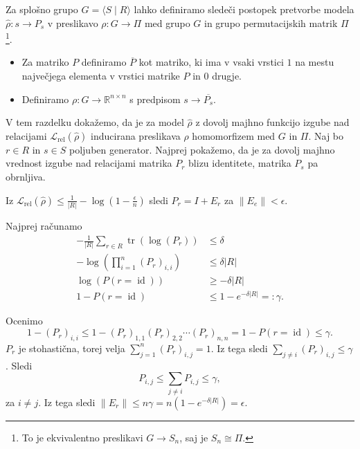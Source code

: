 \documentclass[mat2, tisk]{fmfdelo}
\newcommand{\R}{\mathbb R}
\newcommand{\Loss}[1]{\mathcal L _\text{#1}}
\begin{document}
Za splošno grupo $G=\langle S \mid R \rangle$ lahko definiramo sledeči
postopek pretvorbe modela
$\hat \rho \colon s \to P_s$ v preslikavo $\rho \colon G
\to  \Pi$ med grupo $G$ in grupo permutacijskih matrik
$\Pi$\footnote{To je ekvivalentno preslikavi $G \to
S_n$, saj je $S_n\cong \Pi$.}.
\begin{itemize}
  \item Za matriko $P$ definiramo $\overline{P}$ kot
    matriko, ki ima v vsaki vrstici $1$ na mestu
    največjega elementa v vrstici matrike $P$ in $0$ drugje.
  \item Definiramo $\rho \colon G \to \R^{n \times n}$
    s predpisom $s \to \overline{P_s}$.
\end{itemize}
V tem razdelku dokažemo, da je za model $\hat \rho$ z
dovolj majhno funkcijo izgube nad relacijami
$\Loss{rel}(\hat \rho)$ inducirana preslikava $\rho$
homomorfizem med $G$ in $\Pi$.
%
Naj bo $r\in R$ in $s \in S$ poljuben generator.
Najprej pokažemo, da je za dovolj majhno
vrednost izgube nad relacijami matrika $P_r$ blizu
identitete, matrika $P_s$ pa obrnljiva.
\begin{lema}
  \label{lema:Pr blizu I}
  Iz $\Loss{rel}(\hat\rho) \leq
  \frac{1}{|R|}-\log(1-\frac{\epsilon}{n}) $
  sledi $P_r = I +
  E_r$ za $\|E_e\| < \epsilon$.
\end{lema}
\begin{dokaz}
  Najprej računamo
  \begin{align*}
    - \frac{1}{|R|} \sum_{r \in
    R} \operatorname{tr}(\log(P_r)) &\leq \delta \\
    -\log(\prod_{i=1}^n(P_r)_{i,i}) &\leq \delta |R| \\
    \log(P(r = \operatorname{id})) &\geq -\delta |R| \\
    1 - P(r = \operatorname{id}) &\leq 1 - e^{-\delta
    |R|} =: \gamma.
  \end{align*}

  Ocenimo
  $$ 1 - (P_r)_{i,i} \leq  1 - (P_r)_{1,1}
  (P_r)_{2,2} \dotsm (P_r)_{n,n}
  = 1 - P(r=\operatorname{id})\leq \gamma.$$
  $P_r$ je stohastična, torej velja
  $\sum_{j=1}^n (P_r)_{i,j} = 1$. Iz tega sledi
  $\sum_{j \neq i}
  (P_r)_{i,j} \leq \gamma$. Sledi
  $$
  P_{i, j} \leq \sum_{j \neq i} P_{i,j} \leq \gamma,
  $$
  za $i \neq j$. Iz tega sledi $\|E_r\| \leq n
  \gamma = n(1 - e^{-\delta |R|}) = \epsilon$.
\end{dokaz}
\end{document}
